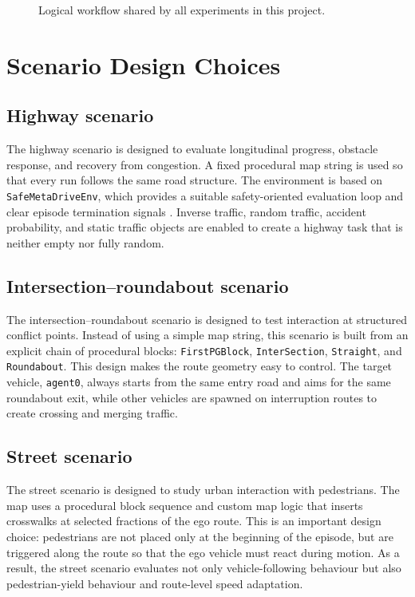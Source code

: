 \documentclass[12pt,a4paper]{report}
\begin{document}
\begin{figure}[H]
    \centering
    \caption{Logical workflow shared by all experiments in this project.}
    \label{fig:arch_layers}
\end{figure}

\section{Scenario Design Choices}
\subsection{Highway scenario}
The highway scenario is designed to evaluate longitudinal progress, obstacle response, and recovery from congestion. A fixed procedural map string is used so that every run follows the same road structure. The environment is based on \texttt{SafeMetaDriveEnv}, which provides a suitable safety-oriented evaluation loop and clear episode termination signals \cite{metadrive_docs}. Inverse traffic, random traffic, accident probability, and static traffic objects are enabled to create a highway task that is neither empty nor fully random.

\subsection{Intersection--roundabout scenario}
The intersection--roundabout scenario is designed to test interaction at structured conflict points. Instead of using a simple map string, this scenario is built from an explicit chain of procedural blocks: \texttt{FirstPGBlock}, \texttt{InterSection}, \texttt{Straight}, and \texttt{Roundabout}. This design makes the route geometry easy to control. The target vehicle, \texttt{agent0}, always starts from the same entry road and aims for the same roundabout exit, while other vehicles are spawned on interruption routes to create crossing and merging traffic.

\subsection{Street scenario}
The street scenario is designed to study urban interaction with pedestrians. The map uses a procedural block sequence and custom map logic that inserts crosswalks at selected fractions of the ego route. This is an important design choice: pedestrians are not placed only at the beginning of the episode, but are triggered along the route so that the ego vehicle must react during motion. As a result, the street scenario evaluates not only vehicle-following behaviour but also pedestrian-yield behaviour and route-level speed adaptation.
\end{document}
